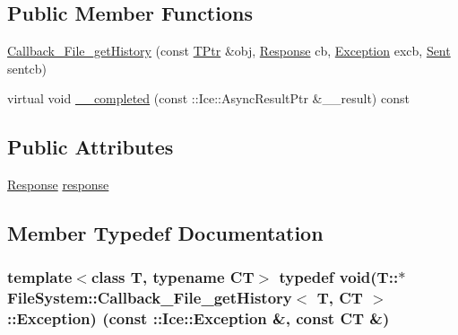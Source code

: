 \subsection*{Public Member Functions}
\begin{DoxyCompactItemize}
\item 
\hyperlink{class_file_system_1_1_callback___file__get_history_a099b4565f686da484102fcbe27eb6a6d}{Callback\+\_\+\+File\+\_\+get\+History} (const \hyperlink{class_file_system_1_1_callback___file__get_history_aafd5b2465ab25e9e58402d052d89de42}{T\+Ptr} \&obj, \hyperlink{class_file_system_1_1_callback___file__get_history_ab5a3b64e414e7c291f6b17ecadecd1db}{Response} cb, \hyperlink{class_file_system_1_1_callback___file__get_history_a06ee015626144ae9e9b6c7da881698fb}{Exception} excb, \hyperlink{class_file_system_1_1_callback___file__get_history_a9fc8d5d98e242cd24719b4d9727c75cf}{Sent} sentcb)
\item 
virtual void \hyperlink{class_file_system_1_1_callback___file__get_history_aca7c379bb2cb7343767aa155cbe47d51}{\+\_\+\+\_\+completed} (const \+::Ice\+::\+Async\+Result\+Ptr \&\+\_\+\+\_\+result) const 
\end{DoxyCompactItemize}
\subsection*{Public Attributes}
\begin{DoxyCompactItemize}
\item 
\hyperlink{class_file_system_1_1_callback___file__get_history_ab5a3b64e414e7c291f6b17ecadecd1db}{Response} \hyperlink{class_file_system_1_1_callback___file__get_history_a16ca6a7305fd1d83892582b167801c6e}{response}
\end{DoxyCompactItemize}


\subsection{Member Typedef Documentation}
\hypertarget{class_file_system_1_1_callback___file__get_history_a06ee015626144ae9e9b6c7da881698fb}{}
\subsubsection[{Exception}]{\setlength{\rightskip}{0pt plus 5cm}template$<$class T, typename C\+T$>$ typedef void(T\+::$\ast$ {\bf File\+System\+::\+Callback\+\_\+\+File\+\_\+get\+History}$<$ T, C\+T $>$\+::Exception) (const \+::Ice\+::\+Exception \&, const C\+T \&)}\label{class_file_system_1_1_callback___file__get_history_a06ee015626144ae9e9b6c7da881698fb}
\hypertarget{class_file_system_1_1_callback___file__get_history_ab5a3b64e414e7c291f6b17ecadecd1db}{}
